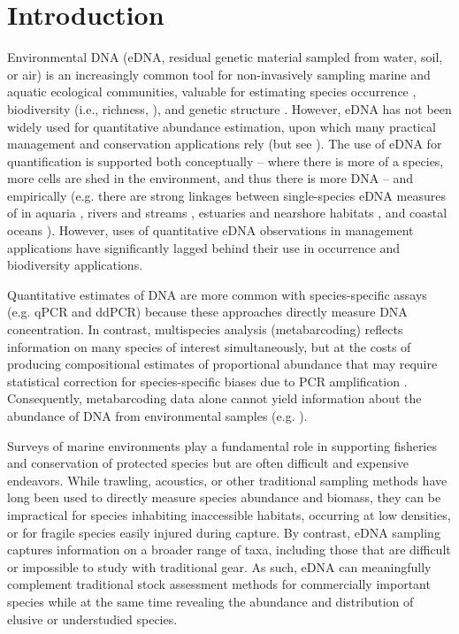 \documentclass{article}
\begin{document}
\section*{Introduction}
Environmental DNA (eDNA, residual genetic material sampled from water, soil, or air) is an increasingly common tool for non-invasively sampling marine and aquatic ecological communities, valuable for estimating species occurrence \cite{veilleux2021}, biodiversity (i.e., richness, \cite{muenzel2024}), and genetic structure \cite{andres2023}. However, eDNA has not been widely used for quantitative abundance estimation, upon which many practical management and conservation applications rely (but see \cite{shelton2022, guri2024a, stoeckle2022a}). The use of eDNA for quantification is supported both conceptually -- where there is more of a species, more cells are shed in the environment, and thus there is more DNA -- and empirically (e.g. there are strong linkages between single-species eDNA measures of in aquaria \cite{jo2019b, ledger2024}, rivers and streams \cite{pont2024}, estuaries and nearshore habitats \cite{dibattista2022, baetscher2023}, and coastal oceans \cite{maes2023, shelton2019}). However, uses of quantitative eDNA observations in management applications have significantly lagged behind their use in occurrence and biodiversity applications. 

Quantitative estimates of DNA are more common with species-specific assays (e.g. qPCR and ddPCR) because these approaches directly measure DNA concentration. In contrast, multispecies analysis (metabarcoding) reflects information on many species of interest simultaneously, but at the costs of producing compositional estimates of proportional abundance \cite{gloor2017, mclaren2019} that may require statistical correction for species-specific biases due to PCR amplification \cite{shelton2023}. Consequently, metabarcoding data alone cannot yield information about the abundance of DNA from environmental samples (e.g. \cite{guri2024a}).

Surveys of marine environments play a fundamental role in supporting fisheries and conservation of protected species but are often difficult and expensive endeavors. While trawling, acoustics, or other traditional sampling methods have long been used to directly measure species abundance and biomass, they can be impractical for species inhabiting inaccessible habitats, occurring at low densities, or for fragile species easily injured during capture. By contrast, eDNA sampling captures information on a broader range of taxa, including those that are difficult or impossible to study with traditional gear. As such, eDNA can meaningfully complement traditional stock assessment methods for commercially important species while at the same time revealing the abundance and distribution of elusive or understudied species.
\end{document}

